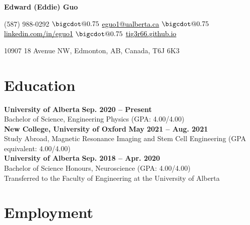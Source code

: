 \documentclass{article}
\makeatletter
\newcommand*\bigcdot{\mathpalette\bigcdot@{0.75}}
\newcommand*\bigcdot@[2]{\mathbin{\vcenter{\hbox{\scalebox{#2}{$\m@th#1\bullet$}}}}}
\makeatother
\begin{document}
\thispagestyle{plain}
\LARGE \textbf{\textcolor{my_colour}{Edward (Eddie) Guo}} \vspace{.25em}

\normalfont \normalsize
(587) 988-0292
    \hspace{.25em} $\bigcdot$ \hspace{.25em}
\href{mailto:eguo1@ualberta.ca}{\textcolor{black}{eguo1@ualberta.ca}}
    \hspace{.25em} $\bigcdot$ \hspace{.25em}
\href{https://www.linkedin.com/in/eguo1}{\textcolor{black}{linkedin.com/in/eguo1}}
    \hspace{.25em} $\bigcdot$ \hspace{.25em}
\href{https://tig3r66.github.io/index.html}{\textcolor{black}{tig3r66.github.io}}

10907 18 Avenue NW, Edmonton, AB, Canada, T6J 6K3
\vspace{-.25em}


\section*{\textcolor{my_colour}{Education}}
\vspace{-.25em} \hrulefill \vspace{.75em}

\textbf{University of Alberta} \hfill \textbf{Sep. 2020 -- Present}\\
Bachelor of Science, Engineering Physics (GPA: 4.00/4.00) \\

\textbf{New College, University of Oxford} \hfill \textbf{May 2021 -- Aug. 2021}\\
Study Abroad, Magnetic Resonance Imaging and Stem Cell Engineering (GPA equivalent: 4.00/4.00) \\

\textbf{University of Alberta} \hfill \textbf{Sep. 2018 -- Apr. 2020} \\
Bachelor of Science Honours, Neuroscience (GPA: 4.00/4.00) \\
Transferred to the Faculty of Engineering at the University of Alberta


\section*{\textcolor{my_colour}{Employment}}
\vspace{-.25em} \hrulefill \vspace{.75em}
\end{document}
